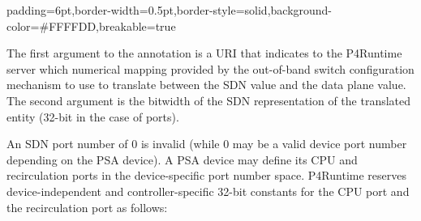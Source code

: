 \documentclass[11pt]{article}
\begin{document}
{%
\begin{mdbmargintb}{6pt}{6pt}%
\begin{mdblock}{padding=6pt,border-width=0.5pt,border-style=solid,background-color=\#FFFFDD,breakable=true}%
\begin{mdpre}%
\end{mdpre}%
\end{mdblock}%
\end{mdbmargintb}%

\noindent{}The first argument to the  annotation is a URI that
indicates to the P4Runtime server which numerical mapping \textemdash{} provided by the
out-of-band switch configuration mechanism \textemdash{} to use to translate between the
SDN value and the data plane value. The second argument is the bitwidth of the
SDN representation of the translated entity (32-bit in the case of ports).%

An SDN port number of 0 is invalid (while 0 may be a valid device port number
depending on the PSA device). A PSA device may define its CPU and recirculation
ports in the device-specific port number space. P4Runtime reserves
device-independent and controller-specific 32-bit constants for the CPU port and
the recirculation port as follows:%

}
\end{document}
